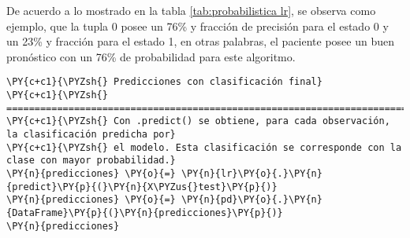 \begin{table}[H]
\centering
\setlength{\tabcolsep}{5pt}
\caption{Predicciones probabilísticas para cada observación Logistic Regression}
\label{tab:probabilistica lr}
\end{table}

	De acuerdo a lo mostrado en la tabla \ref{tab:probabilistica lr}, se observa como ejemplo, que la tupla 0 posee un 76\% y fracción de precisión para el estado 0 y un 23\% y fracción para el estado 1, en otras palabras, el paciente posee un buen pronóstico con un 76\% de probabilidad para este algoritmo.


    \begin{tcolorbox}[breakable, size=fbox, boxrule=1pt, pad at break*=1mm,colback=cellbackground, colframe=cellborder]
\begin{Verbatim}[commandchars=\\\{\}]
\PY{c+c1}{\PYZsh{} Predicciones con clasificación final}
\PY{c+c1}{\PYZsh{} ==============================================================================}
\PY{c+c1}{\PYZsh{} Con .predict() se obtiene, para cada observación, la clasificación predicha por}
\PY{c+c1}{\PYZsh{} el modelo. Esta clasificación se corresponde con la clase con mayor probabilidad.}
\PY{n}{predicciones} \PY{o}{=} \PY{n}{lr}\PY{o}{.}\PY{n}{predict}\PY{p}{(}\PY{n}{X\PYZus{}test}\PY{p}{)}
\PY{n}{predicciones} \PY{o}{=} \PY{n}{pd}\PY{o}{.}\PY{n}{DataFrame}\PY{p}{(}\PY{n}{predicciones}\PY{p}{)}
\PY{n}{predicciones}
\end{Verbatim}
\end{tcolorbox}


